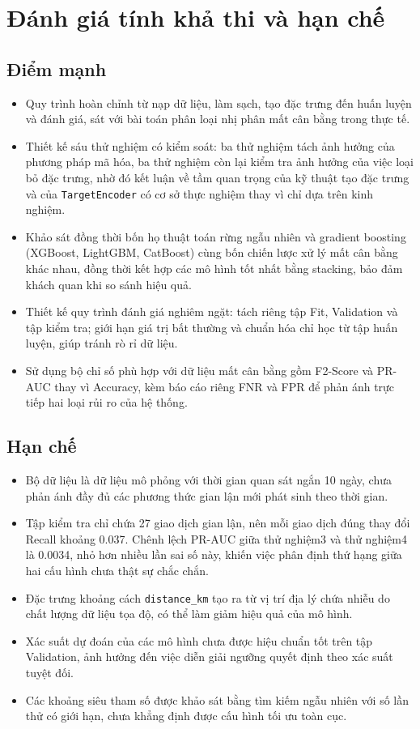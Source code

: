 \section{Đánh giá tính khả thi và hạn chế}
\subsection{Điểm mạnh}
\begin{itemize}
    \item Quy trình hoàn chỉnh từ nạp dữ liệu, làm sạch, tạo đặc trưng đến huấn luyện và đánh giá, sát với bài toán phân loại nhị phân mất cân bằng trong thực tế.
    \item Thiết kế sáu thử nghiệm có kiểm soát: ba thử nghiệm tách ảnh hưởng của phương pháp mã hóa, ba thử nghiệm còn lại kiểm tra ảnh hưởng của việc loại bỏ đặc trưng, nhờ đó kết luận về tầm quan trọng của kỹ thuật tạo đặc trưng và của \texttt{TargetEncoder} có cơ sở thực nghiệm thay vì chỉ dựa trên kinh nghiệm.
    \item Khảo sát đồng thời bốn họ thuật toán rừng ngẫu nhiên và gradient boosting (XGBoost, LightGBM, CatBoost) cùng bốn chiến lược xử lý mất cân bằng khác nhau, đồng thời kết hợp các mô hình tốt nhất bằng stacking, bảo đảm khách quan khi so sánh hiệu quả.
    \item Thiết kế quy trình đánh giá nghiêm ngặt: tách riêng tập Fit, Validation và tập kiểm tra; giới hạn giá trị bất thường và chuẩn hóa chỉ học từ tập huấn luyện, giúp tránh rò rỉ dữ liệu.
    \item Sử dụng bộ chỉ số phù hợp với dữ liệu mất cân bằng gồm F2-Score và PR-AUC thay vì Accuracy, kèm báo cáo riêng FNR và FPR để phản ánh trực tiếp hai loại rủi ro của hệ thống.
\end{itemize}

\subsection{Hạn chế}
\begin{itemize}
    \item Bộ dữ liệu là dữ liệu mô phỏng với thời gian quan sát ngắn 10 ngày, chưa phản ánh đầy đủ các phương thức gian lận mới phát sinh theo thời gian.
    \item Tập kiểm tra chỉ chứa 27 giao dịch gian lận, nên mỗi giao dịch đúng thay đổi Recall khoảng 0{.}037. Chênh lệch PR-AUC giữa thử nghiệm3 và thử nghiệm4 là 0{.}0034, nhỏ hơn nhiều lần sai số này, khiến việc phân định thứ hạng giữa hai cấu hình chưa thật sự chắc chắn.
    \item Đặc trưng khoảng cách \texttt{distance\_km} tạo ra từ vị trí địa lý chứa nhiễu do chất lượng dữ liệu tọa độ, có thể làm giảm hiệu quả của mô hình.
    \item Xác suất dự đoán của các mô hình chưa được hiệu chuẩn tốt trên tập Validation, ảnh hưởng đến việc diễn giải ngưỡng quyết định theo xác suất tuyệt đối.
    \item Các khoảng siêu tham số được khảo sát bằng tìm kiếm ngẫu nhiên với số lần thử có giới hạn, chưa khẳng định được cấu hình tối ưu toàn cục.
\end{itemize}

